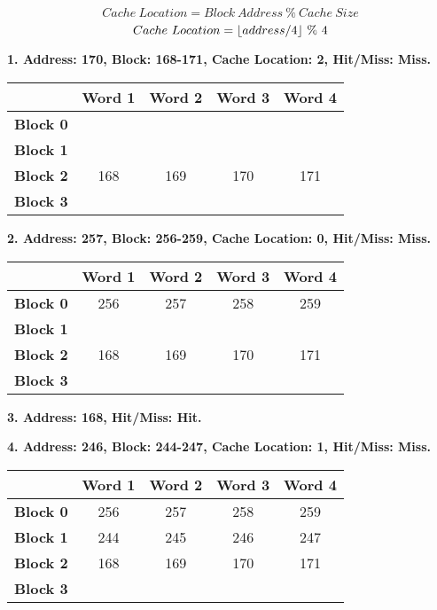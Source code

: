 \documentclass[a4paper, 11pt]{exam}
\DeclarePairedDelimiter\floor{\lfloor}{\rfloor}
\begin{document}
\begin{enumerate}
$$Cache \ Location = Block \ Address \ \% \ Cache \ Size$$
$$Cache \ Location = \floor*{address / 4} \ \% \ 4$$

\textbf{1. Address: 170, Block: 168-171, Cache Location: 2, Hit/Miss: Miss.}

\begin{center}
	\begin{tabular}{ |c|c|c|c|c| } 
		\hline
		&\textbf{Word 1}& \textbf{Word 2}& \textbf{Word 3} & \textbf{Word 4}\\ 
		\hline
		\textbf{Block 0} &  &  & & \\ 
		\hline
		\textbf{Block 1} &  &   &  &\\ 
		\hline
		\textbf{Block 2} & 168 & 169  & 170 & 171\\ 
		\hline
		\textbf{Block 3} &  &   &  &\\ 
		\hline
	\end{tabular}
\end{center}

\textbf{2. Address: 257, Block: 256-259, Cache Location: 0, Hit/Miss: Miss.}

\begin{center}
	\begin{tabular}{ |c|c|c|c|c| } 
		\hline
		&\textbf{Word 1}& \textbf{Word 2}& \textbf{Word 3} & \textbf{Word 4}\\ 
		\hline
		\textbf{Block 0} &  256 &  257 & 258 & 259\\ 
		\hline
		\textbf{Block 1} &  &   &  &\\ 
		\hline
		\textbf{Block 2} & 168 & 169  & 170 & 171\\ 
		\hline
		\textbf{Block 3} &  &   &  &\\ 
		\hline
	\end{tabular}
\end{center}

\textbf{3. Address: 168, Hit/Miss: Hit.}

\textbf{4. Address: 246, Block: 244-247, Cache Location: 1, Hit/Miss: Miss.}

\begin{center}
	\begin{tabular}{ |c|c|c|c|c| } 
		\hline
		&\textbf{Word 1}& \textbf{Word 2}& \textbf{Word 3} & \textbf{Word 4}\\ 
		\hline
		\textbf{Block 0} &  256 &  257 & 258 & 259\\ 
		\hline
		\textbf{Block 1} &  244 & 245 & 246 & 247\\ 
		\hline
		\textbf{Block 2} & 168 & 169  & 170 & 171\\ 
		\hline
		\textbf{Block 3} &  &   &  &\\ 
		\hline
	\end{tabular}
\end{center}


\end{enumerate}
\end{document}
